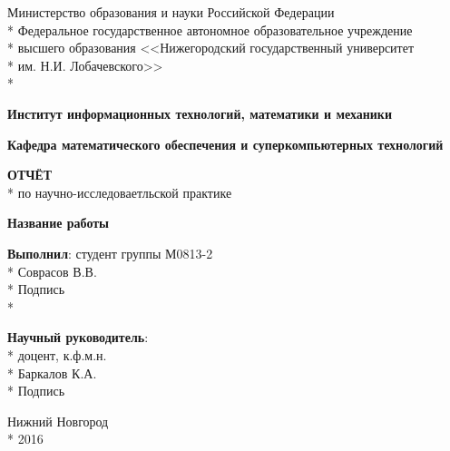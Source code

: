 \begin{titlepage}

\begin{center}
Министерство образования и науки Российской Федерации \\*
Федеральное   государственное  автономное  образовательное  учреждение \\*
высшего образования <<Нижегородский государственный университет \\*
им. Н.И. Лобачевского>> \\*
\end{center}

\vspace{12pt}

\begin{center}
\textbf{Институт информационных технологий, математики и механики}
\end{center}

\begin{center}
\textbf{Кафедра математического обеспечения и суперкомпьютерных технологий}
\end{center}

\vspace{105pt}

\begin{center}
\fontsize{18pt}{0pt}\textbf{ОТЧЁТ} \\*
по научно-исследоваетльской практике
\end{center}

\begin{center}
\fontsize{16pt}{0pt}\textbf{Название работы}
\end{center}

\vspace{53pt}

\begin{flushright}
\textbf{Выполнил}: студент группы М0813-2 \\*
 Соврасов В.В. \\*
Подпись  \\*

\textbf{Научный руководитель}:  \\*
доцент, к.ф.м.н.  \\*
 Баркалов К.А. \\*
Подпись 
\end{flushright}

\vspace{\fill}

\begin{center}
Нижний Новгород \\*
2016
\end{center}

\end{titlepage}
